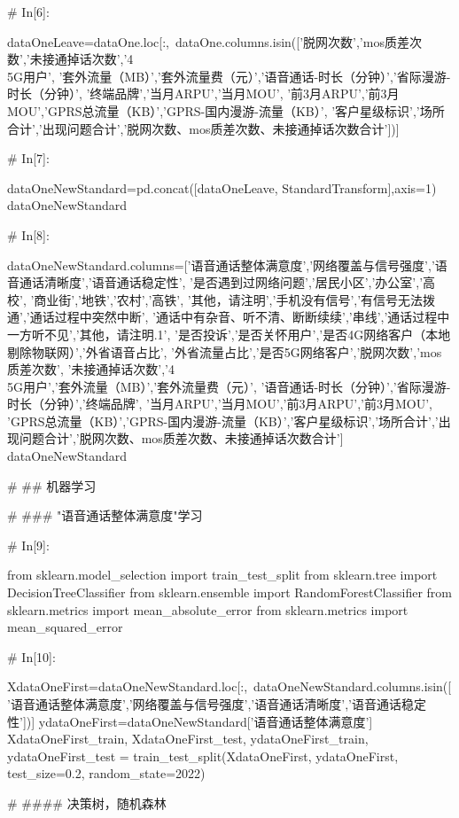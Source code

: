 \documentclass{MathorCupmodeling}
\begin{document}
\begin{python}
# In[6]:


dataOneLeave=dataOne.loc[:,~dataOne.columns.isin(['脱网次数','mos质差次数','未接通掉话次数','4\\5G用户', '套外流量（MB）','套外流量费（元）','语音通话-时长（分钟）','省际漫游-时长（分钟）', '终端品牌','当月ARPU','当月MOU', '前3月ARPU','前3月MOU','GPRS总流量（KB）','GPRS-国内漫游-流量（KB）', '客户星级标识','场所合计','出现问题合计','脱网次数、mos质差次数、未接通掉话次数合计'])]


# In[7]:


dataOneNewStandard=pd.concat([dataOneLeave, StandardTransform],axis=1)
dataOneNewStandard


# In[8]:


dataOneNewStandard.columns=['语音通话整体满意度','网络覆盖与信号强度','语音通话清晰度','语音通话稳定性', '是否遇到过网络问题','居民小区','办公室','高校', '商业街','地铁','农村','高铁', '其他，请注明','手机没有信号','有信号无法拨通','通话过程中突然中断', '通话中有杂音、听不清、断断续续','串线','通话过程中一方听不见','其他，请注明.1', '是否投诉','是否关怀用户','是否4G网络客户（本地剔除物联网）','外省语音占比', '外省流量占比','是否5G网络客户','脱网次数','mos质差次数', '未接通掉话次数','4\\5G用户','套外流量（MB）','套外流量费（元）', '语音通话-时长（分钟）','省际漫游-时长（分钟）','终端品牌', '当月ARPU','当月MOU','前3月ARPU','前3月MOU', 'GPRS总流量（KB）','GPRS-国内漫游-流量（KB）','客户星级标识','场所合计','出现问题合计','脱网次数、mos质差次数、未接通掉话次数合计']
dataOneNewStandard


# ## 机器学习

# ### "语音通话整体满意度"学习

# In[9]:


from sklearn.model_selection import train_test_split
from sklearn.tree import DecisionTreeClassifier
from sklearn.ensemble import RandomForestClassifier
from sklearn.metrics import mean_absolute_error
from sklearn.metrics import mean_squared_error


# In[10]:


XdataOneFirst=dataOneNewStandard.loc[:,~dataOneNewStandard.columns.isin(['语音通话整体满意度','网络覆盖与信号强度','语音通话清晰度','语音通话稳定性'])]
ydataOneFirst=dataOneNewStandard['语音通话整体满意度']
XdataOneFirst_train, XdataOneFirst_test, ydataOneFirst_train, ydataOneFirst_test = train_test_split(XdataOneFirst, ydataOneFirst, test_size=0.2, random_state=2022)


# #### 决策树，随机森林


\end{python}
\end{document}
